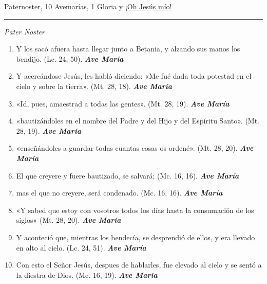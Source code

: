 \documentclass[a4paper,11pt, oneside]{report}
\begin{document}
{{       Paternoster, 10 Avemarías, 1 Gloria y \hyperlink{finalAscension}{¡Oh Jesús mío!}

      \begin{center}\rule{1\linewidth}{\linethickness}\end{center}

      \medskip
      \textit{Pater Noster}

      \begin{enumerate} 

        \item Y los sacó afuera hasta llegar junto a Betania, y alzando sus manos los bendijo. (Lc. 24, 50). \textbf{\textit{Ave María}}

        \item Y acercándose Jesús, les habló diciendo: «Me fué dada toda potestad en el cielo y sobre la tierra». (Mt. 28, 18). \textbf{\textit{Ave María}}

        \item «Id, pues, amaestrad a todas las gentes». (Mt. 28, 19). \textbf{\textit{Ave María}}

        \item «bautizándoles en el nombre del Padre y del Hijo y del Espíritu Santo». (Mt. 28, 19). \textbf{\textit{Ave María}}

        \item «enseñándoles a guardar todas cuantas cosas os ordené». (Mt. 28, 20). \textbf{\textit{Ave María}}

        \item El que creyere y fuere bautizado, se salvará; (Mc. 16, 16). \textbf{\textit{Ave María}}

        \item mas el que no creyere, será condenado. (Mc. 16, 16). \textbf{\textit{Ave María}}

        \item «Y sabed que estoy con vosotros todos los días hasta la consumación de los siglos» (Mt. 28, 20). \textbf{\textit{Ave María}}

        \item Y aconteció que, mientras los bendecía, se desprendió de ellos, y era llevado en alto al cielo. (Lc. 24, 51). \textbf{\textit{Ave María}}

        \item Con esto el Señor Jesús, despues de hablarles, fue elevado al cielo y se sentó a la diestra de Dios. (Mc. 16, 19). \textbf{\textit{Ave María}}


\end{enumerate}}}
\end{document}
